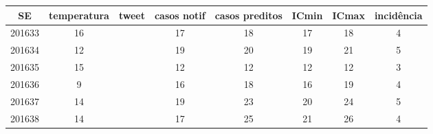 \begin{tabular}{c|ccccccc}
  \hline
SE & temperatura & tweet & casos notif & casos preditos & ICmin & ICmax & incidência \\ 
  \hline
201633 & 16 &  & 17 & 18 & 17 & 18 & 4 \\ 
  201634 & 12 &  & 19 & 20 & 19 & 21 & 5 \\ 
  201635 & 15 &  & 12 & 12 & 12 & 12 & 3 \\ 
  201636 & 9 &  & 16 & 18 & 16 & 19 & 4 \\ 
  201637 & 14 &  & 19 & 23 & 20 & 24 & 5 \\ 
  201638 & 14 &  & 17 & 25 & 21 & 26 & 4 \\ 
   \hline
\end{tabular}
